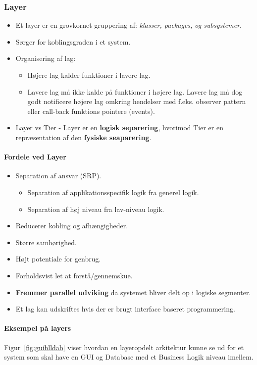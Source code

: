 \subsubsection{Layer}
\begin{itemize}
	\item Et layer er en grovkornet gruppering af: \textit{klasser, packages, og subsystemer}.
	\item Sørger for koblingsgraden i et system.
	\item Organisering af lag:
	\begin{itemize}
		\item Højere lag kalder funktioner i lavere lag.
		\item Lavere lag må ikke kalde på funktioner i højere lag. Lavere lag må dog godt notificere højere lag omkring hendelser med f.eks. observer pattern eller call-back funktions pointere (events).
	\end{itemize}
	\item Layer vs Tier - Layer er en \textbf{logisk separering}, hvorimod Tier er en repræsentation af den \textbf{fysiske seaparering}.
\end{itemize}

\paragraph{Fordele ved Layer}
\begin{itemize}
	\item Separation af ansvar (SRP).
	\begin{itemize}
		\item Separation af applikationsspecifik logik fra generel logik.
		\item Separation af høj niveau fra lav-niveau logik.
	\end{itemize}
	\item Reducerer kobling og afhængigheder.
	\item Større samhørighed.
	\item Højt potentiale for genbrug.
	\item Forholdsvist let at forstå/gennemskue.
	\item \textbf{Fremmer parallel udviking} da systemet bliver delt op i logiske segmenter.
	\item Et lag kan udskriftes hvis der er brugt interface baseret programmering.
\end{itemize}

\paragraph{Eksempel på layers}
Figur~\ref{fig:guiblldab} viser hvordan en layeropdelt arkitektur kunne se ud for et system som skal have en GUI og Database med et Business Logik niveau imellem.

